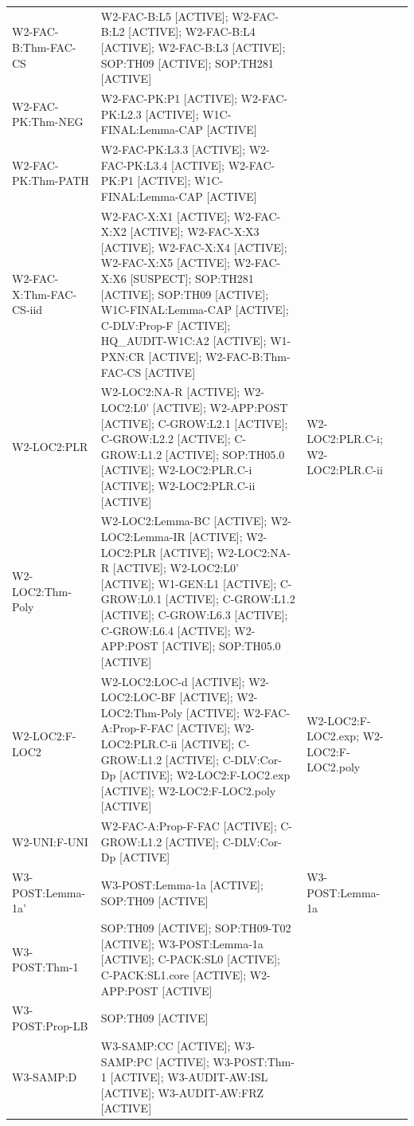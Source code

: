 \begin{longtable}{p{2.6cm}p{7cm}p{2.6cm}p{2cm}}
W2-FAC-B:Thm-FAC-CS & W2-FAC-B:L5 [ACTIVE]; W2-FAC-B:L2 [ACTIVE]; W2-FAC-B:L4 [ACTIVE]; W2-FAC-B:L3 [ACTIVE]; SOP:TH09 [ACTIVE]; SOP:TH281 [ACTIVE] &  &  \\
W2-FAC-PK:Thm-NEG & W2-FAC-PK:P1 [ACTIVE]; W2-FAC-PK:L2.3 [ACTIVE]; W1C-FINAL:Lemma-CAP [ACTIVE] &  &  \\
W2-FAC-PK:Thm-PATH & W2-FAC-PK:L3.3 [ACTIVE]; W2-FAC-PK:L3.4 [ACTIVE]; W2-FAC-PK:P1 [ACTIVE]; W1C-FINAL:Lemma-CAP [ACTIVE] &  &  \\
W2-FAC-X:Thm-FAC-CS-iid & W2-FAC-X:X1 [ACTIVE]; W2-FAC-X:X2 [ACTIVE]; W2-FAC-X:X3 [ACTIVE]; W2-FAC-X:X4 [ACTIVE]; W2-FAC-X:X5 [ACTIVE]; W2-FAC-X:X6 [SUSPECT]; SOP:TH281 [ACTIVE]; SOP:TH09 [ACTIVE]; W1C-FINAL:Lemma-CAP [ACTIVE]; C-DLV:Prop-F [ACTIVE]; HQ\_AUDIT-W1C:A2 [ACTIVE]; W1-PXN:CR [ACTIVE]; W2-FAC-B:Thm-FAC-CS [ACTIVE] &  &  \\
W2-LOC2:PLR & W2-LOC2:NA-R [ACTIVE]; W2-LOC2:L0' [ACTIVE]; W2-APP:POST [ACTIVE]; C-GROW:L2.1 [ACTIVE]; C-GROW:L2.2 [ACTIVE]; C-GROW:L1.2 [ACTIVE]; SOP:TH05.0 [ACTIVE]; W2-LOC2:PLR.C-i [ACTIVE]; W2-LOC2:PLR.C-ii [ACTIVE] & W2-LOC2:PLR.C-i; W2-LOC2:PLR.C-ii &  \\
W2-LOC2:Thm-Poly & W2-LOC2:Lemma-BC [ACTIVE]; W2-LOC2:Lemma-IR [ACTIVE]; W2-LOC2:PLR [ACTIVE]; W2-LOC2:NA-R [ACTIVE]; W2-LOC2:L0' [ACTIVE]; W1-GEN:L1 [ACTIVE]; C-GROW:L0.1 [ACTIVE]; C-GROW:L1.2 [ACTIVE]; C-GROW:L6.3 [ACTIVE]; C-GROW:L6.4 [ACTIVE]; W2-APP:POST [ACTIVE]; SOP:TH05.0 [ACTIVE] &  &  \\
W2-LOC2:F-LOC2 & W2-LOC2:LOC-d [ACTIVE]; W2-LOC2:LOC-BF [ACTIVE]; W2-LOC2:Thm-Poly [ACTIVE]; W2-FAC-A:Prop-F-FAC [ACTIVE]; W2-LOC2:PLR.C-ii [ACTIVE]; C-GROW:L1.2 [ACTIVE]; C-DLV:Cor-Dp [ACTIVE]; W2-LOC2:F-LOC2.exp [ACTIVE]; W2-LOC2:F-LOC2.poly [ACTIVE] & W2-LOC2:F-LOC2.exp; W2-LOC2:F-LOC2.poly &  \\
W2-UNI:F-UNI & W2-FAC-A:Prop-F-FAC [ACTIVE]; C-GROW:L1.2 [ACTIVE]; C-DLV:Cor-Dp [ACTIVE] &  &  \\
W3-POST:Lemma-1a' & W3-POST:Lemma-1a [ACTIVE]; SOP:TH09 [ACTIVE] & W3-POST:Lemma-1a &  \\
W3-POST:Thm-1 & SOP:TH09 [ACTIVE]; SOP:TH09-T02 [ACTIVE]; W3-POST:Lemma-1a [ACTIVE]; C-PACK:SL0 [ACTIVE]; C-PACK:SL1.core [ACTIVE]; W2-APP:POST [ACTIVE] &  &  \\
W3-POST:Prop-LB & SOP:TH09 [ACTIVE] &  &  \\
W3-SAMP:D & W3-SAMP:CC [ACTIVE]; W3-SAMP:PC [ACTIVE]; W3-POST:Thm-1 [ACTIVE]; W3-AUDIT-AW:ISL [ACTIVE]; W3-AUDIT-AW:FRZ [ACTIVE] &  &  \\

\end{longtable}
